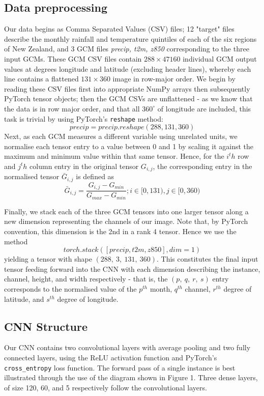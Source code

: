 \documentclass[11pt,a4paper, titlepage]{article}
\begin{document}
\subsection{Data preprocessing}
Our data begins as Comma Separated Values (CSV) files; 12 "target" files describe the monthly rainfall and temperature quintiles of each of the six regions of New Zealand, and 3 GCM files \emph{precip, t2m, z850} corresponding to the three input GCMs. These GCM CSV files contain $288 \times 47160$ individual GCM output values at degrees longitude and latitude (excluding header lines), whereby each line contains a flattened $131 \times 360$ image in row-major order. We begin by reading these CSV files first into appropriate NumPy arrays then subsequently PyTorch tensor objects; then the GCM CSVs are unflattened - as we know that the data is in row major order, and that all $360^{\circ}$ of longitude are included, this task is trivial by using PyTorch's \texttt{reshape} method: $$precip = precip.reshape(288, 131, 360)$$
Next, as each GCM measures a different variable using unrelated units, we normalise each tensor entry to a value between 0 and 1 by scaling it against the maximum and minimum value within that same tensor. Hence, for the $i^th$ row and $j^th$ column entry in the original tensor $G_{i, j}$, the corresponding entry in the normalised tensor $\bar{G}_{i,j}$ is defined as $$\bar{G}_{i,j} = \frac{G_{i,j} - G_{min}}{G_{max} - G_{min}}; i \in [0, 131), j \in [0, 360)$$

\smallskip

Finally, we stack each of the three GCM tensors into one larger tensor along a new dimension representing the channels of our image. Note that, by PyTorch convention, this dimension is the 2nd in a rank 4 tensor. Hence we use the method $$torch.stack([precip, t2m, z850], dim=1)$$
yielding a tensor with shape $(288, \: 3, \: 131, \: 360)$. This constitutes the final input tensor feeding forward into the CNN with each dimension describing the instance, channel, height, and width respectively - that is, the $(p, \: q, \: r, \: s)$ entry corresponds to the normalised value of the $p^{th}$ month, $q^{th}$ channel, $r^{th}$ degree of latitude, and $s^{th}$ degree of longitude.

\subsection{CNN Structure}
Our CNN contains two convolutional layers with average pooling and two fully connected layers, using the ReLU activation function \cite{agarap2018deep} and PyTorch's \texttt{cross\_entropy} loss function. The forward pass of a single instance is best illustrated through the use of the diagram shown in Figure 1. Three dense layers, of size 120, 60, and 5 respectively follow the convolutional layers.
\end{document}
